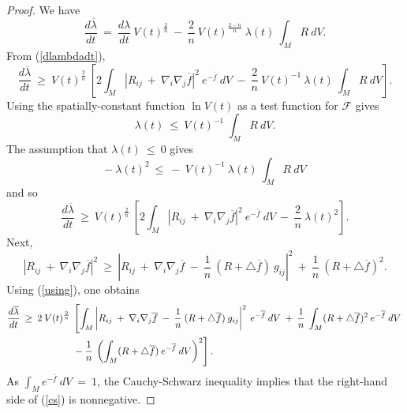 \begin{proof}
We have
\begin{equation}
\frac{d\overline{\lambda}}{dt} \: = \:
\frac{d\lambda}{dt} \: V(t)^{\frac{2}{n}} \: - \:
\frac{2}{n} \: V(t)^{\frac{2-n}{n}} \: \lambda(t) \: \int_M R \: dV.
\end{equation}
From (\ref{dlambdadt}),
\begin{equation}
\frac{d\overline{\lambda}}{dt} \: \ge \:
V(t)^{\frac{2}{n}} \: \left[
2 \int_M |R_{ij} \: + \:
\nabla_i \nabla_j \overline{f}|^2 \: e^{- \overline{f}} \:  dV
 \: - \:
\frac{2}{n} \: V(t)^{-1} \: \lambda(t) \: \int_M R \: dV \right].
\end{equation}
Using the spatially-constant function $\ln V(t)$ as a test function for ${\mathcal F}$
gives
\begin{equation} \label{ttest}
\lambda(t) \: \le \: V(t)^{-1} \: \int_M R \: dV.
\end{equation}
The assumption that $\lambda(t) \: \le \: 0$ gives
\begin{equation}
- \: \lambda(t)^2 \: \le \: - \: V(t)^{-1} \: \lambda(t) \: \int_M R \: dV
\end{equation}
and so
\begin{equation}
\frac{d\overline{\lambda}}{dt} \: \ge \:
V(t)^{\frac{2}{n}} \: \left[
2 \int_M |R_{ij} \: + \:
\nabla_i \nabla_j \overline{f}|^2 \: e^{- \overline{f}} \: dV
 \: - \:
\frac{2}{n} \: \lambda(t)^2 \right].
\end{equation}
Next,
\begin{equation}
|R_{ij} \: + \:
\nabla_i \nabla_j \overline{f}|^2 \: \ge \:
\left| R_{ij} \: + \:
\nabla_i \nabla_j \overline{f} \: - \: \frac{1}{n} \: (R + \triangle \overline{f}) \: g_{ij}
\right|^2 \: + \: \frac{1}{n} \: (R + \triangle \overline{f})^2.
\end{equation}
Using (\ref{using}), one obtains
\begin{align} \label{cs}
\frac{d\overline{\lambda}}{dt} \: \ge \: 2 \:
V(t)^{\frac{2}{n}} \: & \left[
\int_M \left| R_{ij} \: + \:
\nabla_i \nabla_j \overline{f} \: - \: \frac{1}{n} \: (R + \triangle \overline{f}) \:
g_{ij} \right|^2 \: e^{- \overline{f}} \: dV
\: + \: \frac{1}{n} \: \int_M (R + \triangle \overline{f})^2 \: e^{- \overline{f}} \: dV \right. \\
& \left. - \: \frac{1}{n} \: \left( \int_M (R + \triangle \overline{f}) \: e^{- \overline{f}} \: dV
\right)^2 \right]. \notag
\end{align}
As $\int_M e^{- \overline{f}} \: dV \: = \: 1$, the Cauchy-Schwarz inequality implies
that the right-hand side of (\ref{cs}) is nonnegative.
\end{proof}

